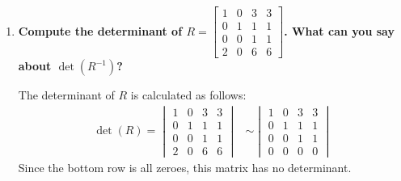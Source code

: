 \documentclass[11pt]{article}
\begin{document}
\begin{enumerate}[label=\textbf{\arabic*.}]
{\begin{enumerate}[label=\textbf{(\alph*)}]
{\begin{align*}
\begin{vmatrix}
                            0 & 1 & 0 & -\frac{1}{2}
                        \end{vmatrix}             \\
                         & \sim
                        \begin{vmatrix}
                            2 & 0 & 0 & 1            \\
                            0 & 1 & 0 & 0            \\
                            0 & 0 & 1 & -2           \\
                            0 & 0 & 0 & -\frac{1}{2}
                        \end{vmatrix}             \\
                         & =(2)(1)(1)\left(-\frac{1}{2}\right) \\
                         & =-1
                    \end{align*}
                    }
              \item{
                    \textbf{\boldmath Compute the determinant of $R=\begin{bmatrix}1 & 0 & 3 & 3 \\ 0 & 1 & 1 & 1 \\ 0 & 0 & 1 & 1 \\ 2 & 0 & 6 & 6\end{bmatrix}$. What can you say about $\det(R^{-1})$?}
                    \par
                    The determinant of $R$ is calculated as follows:
                    \begin{align*}
                        \det(R)=
                        \begin{vmatrix}
                            1 & 0 & 3 & 3 \\
                            0 & 1 & 1 & 1 \\
                            0 & 0 & 1 & 1 \\
                            2 & 0 & 6 & 6
                        \end{vmatrix}
                         & \sim
                        \begin{vmatrix}
                            1 & 0 & 3 & 3 \\
                            0 & 1 & 1 & 1 \\
                            0 & 0 & 1 & 1 \\
                            0 & 0 & 0 & 0
                        \end{vmatrix}
                    \end{align*}
                    Since the bottom row is all zeroes, this matrix has no determinant.
                    }
          \end{enumerate}
          }
\end{enumerate}
\end{document}
